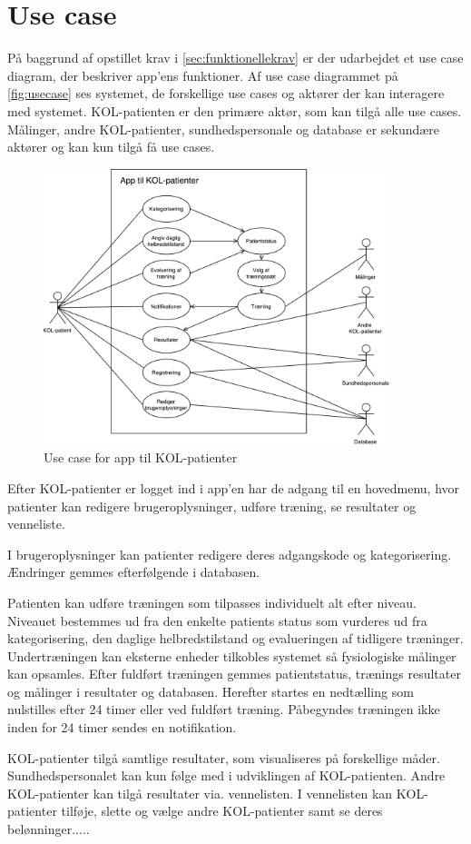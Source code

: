 \section{Use case} \label{sec:usecase} 
På baggrund af opstillet krav i \autoref{sec:funktionellekrav} er der udarbejdet et use case diagram, der beskriver app'ens funktioner. Af use case diagrammet på \autoref{fig:usecase} ses systemet, de forskellige use cases og aktører der kan interagere med systemet. KOL-patienten er den primære aktør, som kan tilgå alle use cases. Målinger, andre KOL-patienter, sundhedspersonale og database er sekundære aktører og kan kun tilgå få use cases. 

\begin{figure} [H]
\centering
\includegraphics[width=0.9\textwidth]{figures/aktivitetsdiagram/Usecase}
\caption{Use case for app til KOL-patienter}
\label{fig:usecase}
\end{figure}

\noindent
Efter KOL-patienter er logget ind i app'en har de adgang til en hovedmenu, hvor patienter kan redigere brugeroplysninger, udføre træning, se resultater og venneliste. 


I brugeroplysninger kan patienter redigere deres adgangskode og kategorisering. Ændringer gemmes efterfølgende i databasen. 

Patienten kan udføre træningen som tilpasses individuelt alt efter niveau. Niveauet bestemmes ud fra den enkelte patients status som vurderes ud fra kategorisering, den daglige helbredstilstand og evalueringen af tidligere træninger. 
Undertræningen kan eksterne enheder tilkobles systemet så fysiologiske målinger kan opsamles. Efter fuldført træningen gemmes patientstatus, trænings resultater og målinger i resultater og databasen. Herefter startes en nedtælling som nulstilles efter 24 timer eller ved fuldført træning. Påbegyndes træningen ikke inden for 24 timer sendes en notifikation. 


KOL-patienter tilgå samtlige resultater, som visualiseres på forskellige måder. Sundhedspersonalet kan kun følge med i udviklingen af KOL-patienten. Andre KOL-patienter kan tilgå resultater via. vennelisten. I vennelisten kan KOL-patienter tilføje, slette og vælge andre KOL-patienter samt se deres belønninger..... 



